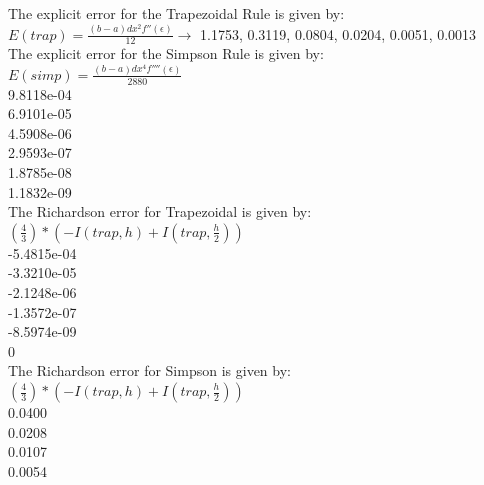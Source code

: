 \documentclass[10pt,a4paper]{article}
\begin{document}
The explicit error for the Trapezoidal Rule is given by: \\ 

$ E(trap) = \frac{(b - a)dx^2 f''(\epsilon)}{12}  \rightarrow  $  1.1753, 0.3119, 0.0804,    0.0204,    0.0051,    0.0013 \\

The explicit error for the Simpson Rule is given by: \\

$ E(simp) = \frac{(b - a)dx^4 f''''(\epsilon)}{2880} $ \\ 

9.8118e-04 \\ 

6.9101e-05 \\ 

4.5908e-06 \\

2.9593e-07\\ 

1.8785e-08\\ 

1.1832e-09 \\

\noindent
The Richardson error for Trapezoidal is given by: \\
$ (\frac{4}{3}) * ( - I(trap, h) + I(trap, \frac{h}{2})) $ \\

-5.4815e-04 \\

-3.3210e-05 \\

-2.1248e-06 \\

-1.3572e-07 \\

-8.5974e-09 \\

0 \\

\noindent
The Richardson error for Simpson is given by: \\
$ (\frac{4}{3}) * ( - I(trap, h) + I(trap, \frac{h}{2})) $ \\

0.0400 \\

0.0208 \\

0.0107 \\

0.0054 \\
\end{document}
